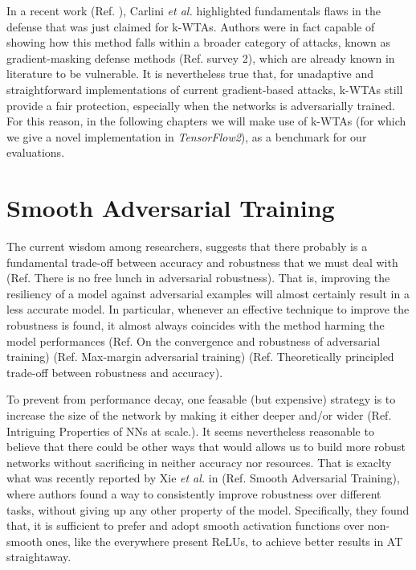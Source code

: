 \documentclass[LaM,binding=0.6cm]{./packages/sapthesis/sapthesis}
\begin{document}
    In a recent work (Ref. ), Carlini \textit{et al.} highlighted fundamentals flaws in the defense that was just claimed for k-WTAs.
    Authors were in fact capable of showing how this method falls within a broader category of attacks, known as gradient-masking
    defense methods (Ref. survey 2), which are already known in literature to be vulnerable.
    It is nevertheless true that, for unadaptive and straightforward implementations of current gradient-based attacks, k-WTAs
    still provide a fair protection, especially when the networks is adversarially trained. For this reason, in the following chapters
    we will make use of k-WTAs (for which we give a novel implementation in \textit{TensorFlow2}), as a benchmark for our evaluations.

    \section{Smooth Adversarial Training}
    \label{SAT}

    The current wisdom among researchers, suggests that there probably is a fundamental trade-off between accuracy and robustness that we must deal with
    (Ref. There is no free lunch in adversarial robustness). That is, improving the resiliency of a model against adversarial examples will almost certainly 
    result in a less accurate model. In particular, whenever an effective technique to improve the robustness is found, it almost always coincides with the method harming
    the model performances (Ref. On the convergence and robustness of adversarial training) (Ref. Max-margin adversarial training) (Ref. 
    Theoretically principled trade-off between robustness and accuracy).
    
    To prevent from performance decay, one feasable (but expensive) strategy is to increase the size of the network by making it either deeper and/or wider (Ref. Intriguing Properties of NNs at scale.).
    It seems nevertheless reasonable to believe that there could be other ways that would allows us to build more robust networks without 
    sacrificing in neither accuracy nor resources. That is exaclty what was recently reported by Xie \textit{et al.} in (Ref. Smooth Adversarial Training), where authors 
    found a way to consistently improve robustness over different tasks, without giving up any other property of the model. Specifically, they found that,
    it is sufficient to prefer and adopt smooth activation functions over non-smooth ones, like the everywhere present ReLUs, to achieve 
    better results in AT straightaway.
\end{document}
